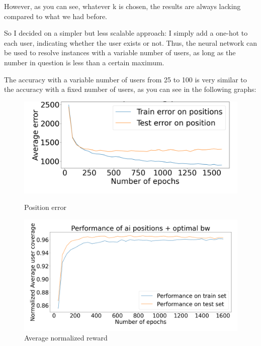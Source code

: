 \documentclass[letterpaper]{article}
\begin{document}
However, as you can see, whatever k is chosen, the results are always lacking compared to what we had before.

So I decided on a simpler but less scalable approach: I simply add a one-hot to each user, indicating whether the user exists or not.
Thus, the neural network can be used to resolve instances with a variable number of users, as long as the number in question is less than a certain maximum.

The accuracy with a variable number of users from 25 to 100 is very similar to the accuracy with a fixed number of users, as you can see in the following graphs:

\begin{figure}[H]
    \centering
    \begin{minipage}[b]{0.45\textwidth}
        \centering
        \includegraphics[width=\textwidth]{images/error_pos_variable_user_number.png}
        \caption{Position error}
    \end{minipage}
    \hspace{0.05\textwidth}
    \begin{minipage}[b]{0.45\textwidth}
        \centering
        \includegraphics[width=\textwidth]{images/reward_variable_user_number.png}
        \caption{Average normalized reward}
    \end{minipage}
\end{figure}
\end{document}
